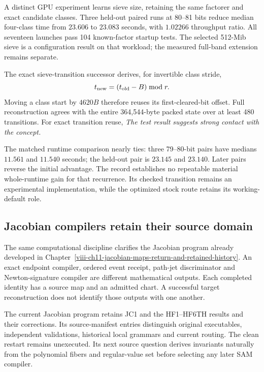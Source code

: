 A distinct GPU experiment learns sieve size, retaining
the same factorer and exact candidate classes.
Three held-out paired runs at 80--81 bits reduce
median four-class time from \(23.606\) to \(23.083\)
seconds, with \(1.02266\) throughput ratio.
All seventeen launches pass 104 known-factor startup
tests. The selected 512-Mib sieve is a configuration
result on that workload; the measured full-band
extension remains separate.

The exact sieve-transition successor derives, for
invertible class stride,
\[
 t_{\rm new}=(t_{\rm old}-B)\bmod r.
\]
Moving a class start by \(4620B\) therefore reuses its
first-cleared-bit offset. Full reconstruction agrees
with the entire 364,544-byte packed state over at least
480 transitions. For exact transition reuse,
\emph{The test result suggests strong contact with the
concept.}

The matched runtime comparison nearly ties: three
79--80-bit pairs have medians \(11.561\) and
\(11.540\) seconds; the held-out pair is \(23.145\)
and \(23.140\). Later pairs reverse the initial
advantage. The record establishes no repeatable
material whole-runtime gain for that recurrence.
Its checked transition remains an experimental
implementation, while the optimized stock route
retains its working-default role.

\subsection{Jacobian compilers retain their source domain}

The same computational discipline clarifies the
Jacobian program already developed in
Chapter~\ref{viii-ch11-jacobian-maps-return-and-retained-history}.
An exact endpoint compiler, ordered event receipt,
path-jet discriminator and Newton-signature compiler
are different mathematical outputs. Each completed
identity has a source map and an admitted chart.
A successful target reconstruction does not identify
those outputs with one another.

The current Jacobian program retains JC1 and the
HF1--HF6TH results and their corrections. Its
source-manifest entries distinguish original
executables, independent validations, historical
local grammars and current routing. The clean
restart remains unexecuted. Its next source
question derives invariants naturally from the
polynomial fibers and regular-value set before
selecting any later SAM compiler.

